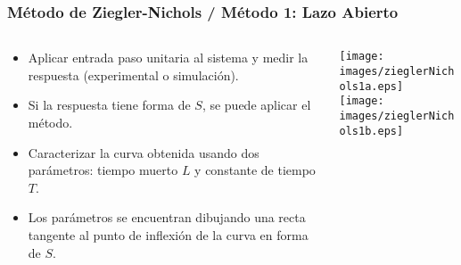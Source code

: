 \documentclass[aspectratio=169]{beamer}
\theoremstyle{definition}
\theoremstyle{plain}
\theoremstyle{remark}
\begin{document}
\begin{frame}[<+->]\frametitle{Método de Ziegler-Nichols / Método 1: Lazo Abierto}
\small
\vspace*{-2mm}
\begin{columns}
\begin{column}{0.5\textwidth}
\begin{itemize}
	\item Aplicar entrada paso unitaria al sistema y medir la respuesta (experimental o simulación).
	\item Si la respuesta tiene forma de $S$, se puede aplicar el método.
	\item Caracterizar la curva obtenida usando dos parámetros: tiempo muerto $L$ y constante de tiempo $T$.
	\item Los parámetros se encuentran dibujando una recta tangente al punto de inflexión de la curva en forma de $S$.
\end{itemize}
\end{column}	
\begin{column}{0.5\textwidth}
\texttt{[image: images/zieglerNichols1a.eps]}\\
\vspace*{5mm}
\texttt{[image: images/zieglerNichols1b.eps]}
\end{column}	
\end{columns}
\end{frame}
\end{document}
